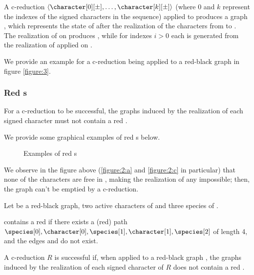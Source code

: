 A c-reduction $\langle \character[0][\pm], \dots, \character[k][\pm] \rangle$ (where $0$ and $k$ represent the indexes of the signed characters in the sequence) applied to \grb{} produces a graph \grb[k], which represents the state of \grb{} after the realization of the characters from \character[0][\pm] to \character[k][\pm].
The realization of \character[0][\pm] on \grb{} produces \grb[0], while for indexes $i > 0$ each \grb[i] is generated from the realization of \character[i][\pm] applied on \grb[i-1].

We provide an example for a c-reduction being applied to a red-black graph in figure \ref{figure:3}.

\subsubsection*{Red \boldmath{\sg{}}s}

For a c-reduction to be successful, the graphs \grb[i] induced by the realization of each signed character \character[i][\pm] must not contain a red \sg{}.

We provide some graphical examples of red \sg{}s below.

\begin{figure}[H]
  

  \caption{Examples of red \sg{}s}\label{figure:2}
\end{figure}

We observe in the figure above (\ref{figure:2:a} and \ref{figure:2:c} in particular) that none of the characters are free in \grb{}, making the realization of any \character[i][-] impossible; then, the graph can't be emptied by a c-reduction.

\begin{definition}[Red \sg{}]\label{definition:sigma-graph}
  Let \grb{} be a red-black graph, \character[0] \character[1] two active characters of \grb{} and \species[0] \species[1] \species[2] three species of \grb{}.

  \grb{} contains a red \sg{} if there exists a (red) path $\species[0], \character[0], \species[1], \character[1], \species[2]$ of length 4, and the edges \edge{\character[0]}{\species[2]} and \edge{\character[1]}{\species[0]} do not exist.
\end{definition}

A c-reduction $R$ is successful if, when applied to a red-black graph \grb{}, the graphs \grb[i] induced by the realization of each signed character \character[i][\pm] of $R$ does not contain a red \sg{}.

